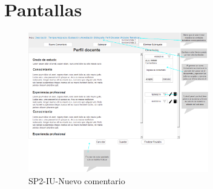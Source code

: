 \chapter{Pantallas}
 \begin{figure}
  \centering
    \includegraphics[width=0.7\textwidth]{DCU/SP2/Pantallas/Nuevo_comentario}
  \caption{SP2-IU-Nuevo comentario}
  \label{SP2-IU-Nuevo_comentario}
\end{figure}

